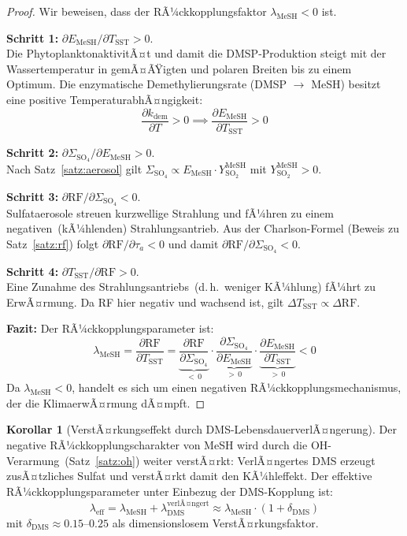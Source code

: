 ﻿\documentclass[a4paper,12pt]{article}
\theoremstyle{definition}
\newtheorem{korollar}{Korollar}
\begin{document}
\begin{proof}
  Wir beweisen, dass der RÃ¼ckkopplungsfaktor $\lambda_{\mathrm{MeSH}} < 0$ ist.

  \textbf{Schritt 1:} $\partial E_{\mathrm{MeSH}} / \partial T_{\mathrm{SST}} > 0$.\\
  Die PhytoplanktonaktivitÃ¤t und damit die DMSP-Produktion steigt mit der Wassertemperatur in
  gemÃ¤ÃŸigten und polaren Breiten bis zu einem Optimum. Die enzymatische Demethylierungsrate
  (DMSP $\rightarrow$ MeSH) besitzt eine positive TemperaturabhÃ¤ngigkeit:
  \[
    \frac{\partial k_{\mathrm{dem}}}{\partial T} > 0 \implies \frac{\partial E_{\mathrm{MeSH}}}{\partial T_{\mathrm{SST}}} > 0
  \]

  \textbf{Schritt 2:} $\partial \Sigma_{\mathrm{SO_4}} / \partial E_{\mathrm{MeSH}} > 0$.\\
  Nach Satz~\ref{satz:aerosol} gilt $\Sigma_{\mathrm{SO_4}} \propto E_{\mathrm{MeSH}} \cdot Y_{\mathrm{SO_2}}^{\mathrm{MeSH}}$ mit $Y_{\mathrm{SO_2}}^{\mathrm{MeSH}} > 0$.

  \textbf{Schritt 3:} $\partial \mathrm{RF} / \partial \Sigma_{\mathrm{SO_4}} < 0$.\\
  Sulfataerosole streuen kurzwellige Strahlung und fÃ¼hren zu einem negativen~(kÃ¼hlenden)
  Strahlungsantrieb. Aus der Charlson-Formel (Beweis zu Satz~\ref{satz:rf}) folgt
  $\partial \mathrm{RF} / \partial \tau_a < 0$ und damit
  $\partial \mathrm{RF} / \partial \Sigma_{\mathrm{SO_4}} < 0$.

  \textbf{Schritt 4:} $\partial T_{\mathrm{SST}} / \partial \mathrm{RF} > 0$.\\
  Eine Zunahme des Strahlungsantriebs~(d.\,h.\ weniger KÃ¼hlung) fÃ¼hrt zu ErwÃ¤rmung. Da
  RF hier negativ und wachsend ist, gilt $\Delta T_{\mathrm{SST}} \propto \Delta\mathrm{RF}$.

  \textbf{Fazit:} Der RÃ¼ckkopplungsparameter ist:
  \[
    \lambda_{\mathrm{MeSH}} = \frac{\partial \mathrm{RF}}{\partial T_{\mathrm{SST}}}
    = \underbrace{\frac{\partial \mathrm{RF}}{\partial \Sigma_{\mathrm{SO_4}}}}_{<\,0}
    \cdot \underbrace{\frac{\partial \Sigma_{\mathrm{SO_4}}}{\partial E_{\mathrm{MeSH}}}}_{>\,0}
    \cdot \underbrace{\frac{\partial E_{\mathrm{MeSH}}}{\partial T_{\mathrm{SST}}}}_{>\,0}
    < 0
  \]
  Da $\lambda_{\mathrm{MeSH}} < 0$, handelt es sich um einen negativen RÃ¼ckkopplungsmechanismus,
  der die KlimaerwÃ¤rmung dÃ¤mpft. \qedhere
\end{proof}

\begin{korollar}[VerstÃ¤rkungseffekt durch DMS-LebensdauerverlÃ¤ngerung]
  Der negative RÃ¼ckkopplungscharakter von MeSH wird durch die OH-Verarmung~(Satz~\ref{satz:oh})
  weiter verstÃ¤rkt: VerlÃ¤ngertes DMS erzeugt zusÃ¤tzliches Sulfat und verstÃ¤rkt damit den
  KÃ¼hleffekt. Der effektive RÃ¼ckkopplungsparameter unter Einbezug der DMS-Kopplung ist:
  \[
    \lambda_{\mathrm{eff}} = \lambda_{\mathrm{MeSH}} + \lambda_{\mathrm{DMS}}^{\mathrm{verlÃ¤ngert}}
    \approx \lambda_{\mathrm{MeSH}} \cdot (1 + \delta_{\mathrm{DMS}})
  \]
  mit $\delta_{\mathrm{DMS}} \approx 0.15$--$0.25$ als dimensionslosem VerstÃ¤rkungsfaktor.
\end{korollar}
\end{document}
